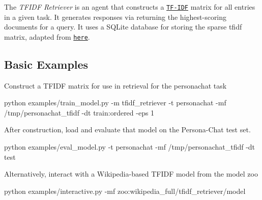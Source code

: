 The {\itshape T\+F\+I\+DF Retriever} is an agent that constructs a \href{https://en.wikipedia.org/wiki/Tf%E2%80%93idf}{\tt T\+F-\/\+I\+DF} matrix for all entries in a given task. It generates responses via returning the highest-\/scoring documents for a query. It uses a S\+Q\+Lite database for storing the sparse tfidf matrix, adapted from \href{http://github.com/facebookresearch/DrQA/}{\tt here}.

\subsection*{Basic Examples}

Construct a T\+F\+I\+DF matrix for use in retrieval for the personachat task 
\begin{DoxyCode}
python examples/train\_model.py -m tfidf\_retriever -t personachat -mf /tmp/personachat\_tfidf -dt
       train:ordered -eps 1
\end{DoxyCode}


After construction, load and evaluate that model on the Persona-\/\+Chat test set.


\begin{DoxyCode}
python examples/eval\_model.py -t personachat -mf /tmp/personachat\_tfidf -dt test
\end{DoxyCode}


Alternatively, interact with a Wikipedia-\/based T\+F\+I\+DF model from the model zoo


\begin{DoxyCode}
python examples/interactive.py -mf zoo:wikipedia\_full/tfidf\_retriever/model
\end{DoxyCode}
 